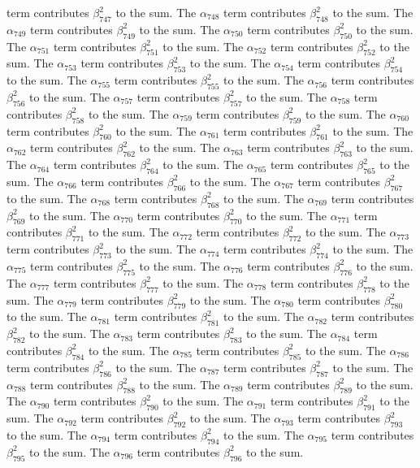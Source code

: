 \begin{lemma}
term contributes $\beta_{747}^{2}$ to the sum. The $\alpha_{748}$ term contributes $\beta_{748}^{2}$ to the sum. The $\alpha_{749}$ term contributes $\beta_{749}^{2}$ to the sum. The $\alpha_{750}$ term contributes $\beta_{750}^{2}$ to the sum. The $\alpha_{751}$ term contributes $\beta_{751}^{2}$ to the sum. The $\alpha_{752}$ term contributes $\beta_{752}^{2}$ to the sum. The $\alpha_{753}$ term contributes $\beta_{753}^{2}$ to the sum. The $\alpha_{754}$ term contributes $\beta_{754}^{2}$ to the sum. The $\alpha_{755}$ term contributes $\beta_{755}^{2}$ to the sum. The $\alpha_{756}$ term contributes $\beta_{756}^{2}$ to the sum. The $\alpha_{757}$ term contributes $\beta_{757}^{2}$ to the sum. The $\alpha_{758}$ term contributes $\beta_{758}^{2}$ to the sum. The $\alpha_{759}$ term contributes $\beta_{759}^{2}$ to the sum. The $\alpha_{760}$ term contributes $\beta_{760}^{2}$ to the sum. The $\alpha_{761}$ term contributes $\beta_{761}^{2}$ to the sum. The $\alpha_{762}$ term contributes $\beta_{762}^{2}$ to the sum. The $\alpha_{763}$ term contributes $\beta_{763}^{2}$ to the sum. The $\alpha_{764}$ term contributes $\beta_{764}^{2}$ to the sum. The $\alpha_{765}$ term contributes $\beta_{765}^{2}$ to the sum. The $\alpha_{766}$ term contributes $\beta_{766}^{2}$ to the sum. The $\alpha_{767}$ term contributes $\beta_{767}^{2}$ to the sum. The $\alpha_{768}$ term contributes $\beta_{768}^{2}$ to the sum. The $\alpha_{769}$ term contributes $\beta_{769}^{2}$ to the sum. The $\alpha_{770}$ term contributes $\beta_{770}^{2}$ to the sum. The $\alpha_{771}$ term contributes $\beta_{771}^{2}$ to the sum. The $\alpha_{772}$ term contributes $\beta_{772}^{2}$ to the sum. The $\alpha_{773}$ term contributes $\beta_{773}^{2}$ to the sum. The $\alpha_{774}$ term contributes $\beta_{774}^{2}$ to the sum. The $\alpha_{775}$ term contributes $\beta_{775}^{2}$ to the sum. The $\alpha_{776}$ term contributes $\beta_{776}^{2}$ to the sum. The $\alpha_{777}$ term contributes $\beta_{777}^{2}$ to the sum. The $\alpha_{778}$ term contributes $\beta_{778}^{2}$ to the sum. The $\alpha_{779}$ term contributes $\beta_{779}^{2}$ to the sum. The $\alpha_{780}$ term contributes $\beta_{780}^{2}$ to the sum. The $\alpha_{781}$ term contributes $\beta_{781}^{2}$ to the sum. The $\alpha_{782}$ term contributes $\beta_{782}^{2}$ to the sum. The $\alpha_{783}$ term contributes $\beta_{783}^{2}$ to the sum. The $\alpha_{784}$ term contributes $\beta_{784}^{2}$ to the sum. The $\alpha_{785}$ term contributes $\beta_{785}^{2}$ to the sum. The $\alpha_{786}$ term contributes $\beta_{786}^{2}$ to the sum. The $\alpha_{787}$ term contributes $\beta_{787}^{2}$ to the sum. The $\alpha_{788}$ term contributes $\beta_{788}^{2}$ to the sum. The $\alpha_{789}$ term contributes $\beta_{789}^{2}$ to the sum. The $\alpha_{790}$ term contributes $\beta_{790}^{2}$ to the sum. The $\alpha_{791}$ term contributes $\beta_{791}^{2}$ to the sum. The $\alpha_{792}$ term contributes $\beta_{792}^{2}$ to the sum. The $\alpha_{793}$ term contributes $\beta_{793}^{2}$ to the sum. The $\alpha_{794}$ term contributes $\beta_{794}^{2}$ to the sum. The $\alpha_{795}$ term contributes $\beta_{795}^{2}$ to the sum. The $\alpha_{796}$ term contributes $\beta_{796}^{2}$ to the sum. 
\end{lemma}
